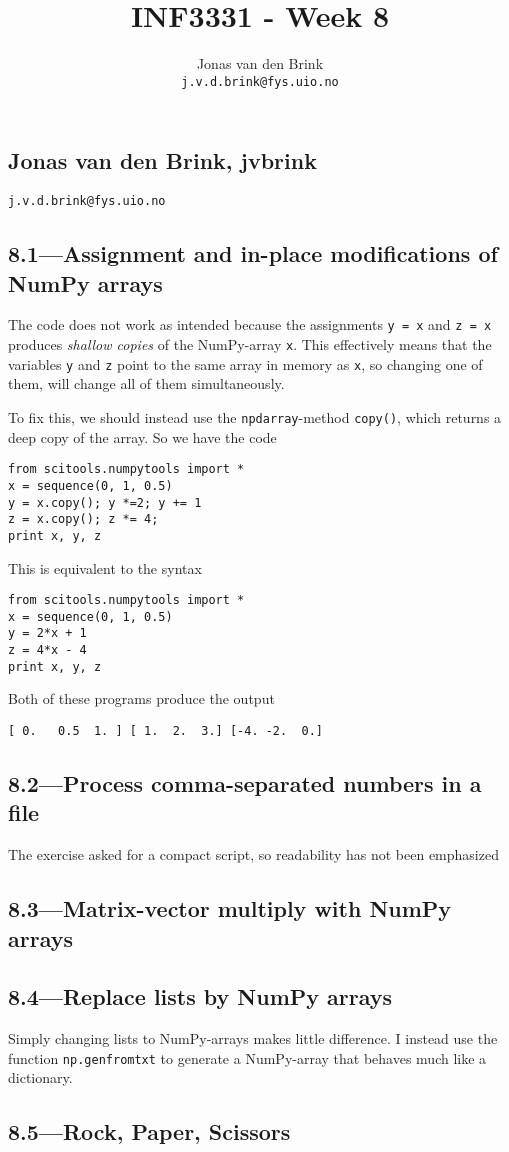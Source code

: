 \documentclass[a4paper, 11pt, titlepage, english]{article}
\title{INF3331 - Week 8}
\author{Jonas van den Brink \\ \texttt{j.v.d.brink@fys.uio.no}}
\begin{document}
\pagestyle{empty}
\subsection*{Jonas van den Brink, jvbrink}
\texttt{j.v.d.brink@fys.uio.no}
\subsection*{8.1---Assignment and in-place modifications of NumPy arrays}
The code does not work as intended because the assignments \verb+y = x+ and \verb+z = x+ produces \emph{shallow copies} of the NumPy-array \verb+x+. This effectively means that the variables \verb+y+ and \verb+z+ point to the same array in memory as \verb+x+, so changing one of them, will change all of them simultaneously.

To fix this, we should instead use the \verb+npdarray+-method \verb+copy()+, which returns a deep copy of the array. So we have the code
\begin{lstlisting}
from scitools.numpytools import *
x = sequence(0, 1, 0.5)
y = x.copy(); y *=2; y += 1
z = x.copy(); z *= 4; 
print x, y, z
\end{lstlisting}
This is equivalent to the syntax
\begin{lstlisting}
from scitools.numpytools import *
x = sequence(0, 1, 0.5)
y = 2*x + 1
z = 4*x - 4
print x, y, z
\end{lstlisting}
Both of these programs produce the output
\begin{lstlisting}
[ 0.   0.5  1. ] [ 1.  2.  3.] [-4. -2.  0.]
\end{lstlisting}

\subsection*{8.2---Process comma-separated numbers in a file}
The exercise asked for a compact script, so readability has not been emphasized


\clearpage

\subsection*{8.3---Matrix-vector multiply with NumPy arrays}


\subsection*{8.4---Replace lists by NumPy arrays}
Simply changing lists to NumPy-arrays makes little difference. I instead use the function \verb+np.genfromtxt+ to generate a NumPy-array that behaves much like a dictionary.



\clearpage

\subsection*{8.5---Rock, Paper, Scissors}


\end{document}
